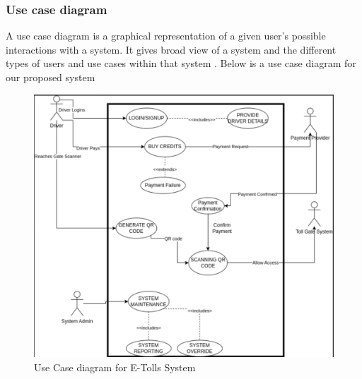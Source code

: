 \clearpage

\clearpage

\subsubsection{Use case diagram}
A use case diagram is a graphical representation of a given user's possible interactions with a system. It gives broad view of a system and the different types of users and use cases within that system \cite{alhir2003learning}.
Below is a use case diagram for our proposed system
\begin{figure}[h]
    \begin{center}
        \hspace{-2cm}
        \includegraphics[scale = 0.6]{images/use case diagram}
        \caption{Use Case diagram for E-Tolls System}
    \end{center}
\end{figure}

\clearpage

